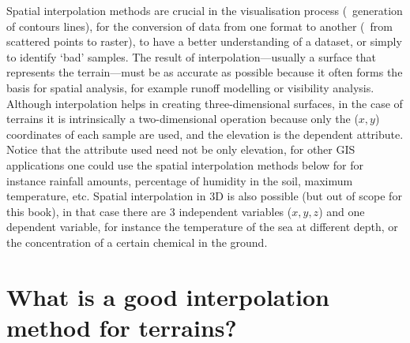 Spatial interpolation methods are crucial in the visualisation process (\eg\ generation of contours lines), for the conversion of data from one format to another (\eg\ from scattered points to raster), to have a better understanding of a dataset, or simply to identify `bad' samples. 
The result of interpolation---usually a surface that represents the terrain---must be as accurate as possible because it often forms the basis for spatial analysis, for example runoff modelling or visibility analysis. 
Although interpolation helps in creating three-dimensional surfaces, in the case of terrains it is intrinsically a two-dimensional operation because only the ($x,y$) coordinates of each sample are used, and the elevation is the dependent attribute.
Notice that the attribute used need not be only elevation, for other GIS applications one could use the spatial interpolation methods below for for instance rainfall amounts, percentage of humidity in the soil, maximum temperature, etc. 
Spatial interpolation in 3D is also possible (but out of scope for this book), in that case there are 3 independent variables ($x,y,z$) and one dependent variable, for instance the temperature of the sea at different depth, or the concentration of a certain chemical in the ground.


%


\section{What is a good interpolation method for terrains?}%
\label{sec:interpol_properties}

